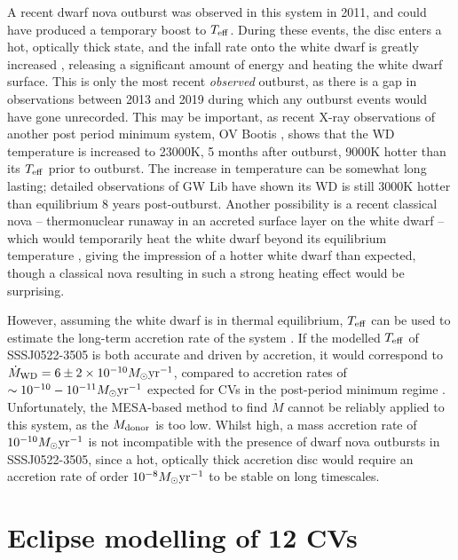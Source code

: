 A recent dwarf nova outburst was observed in this system in 2011, and could have produced a temporary boost to $T_{\rm eff}$. During these events, the disc enters a hot, optically thick state, and the infall rate onto the white dwarf is greatly increased \citep{osaki1996}, releasing a significant amount of energy and heating the white dwarf surface.
This is only the most recent \textit{observed} outburst, as there is a gap in observations between 2013 and 2019 during which any outburst events would have gone unrecorded. This may be important, as recent X-ray observations of another post period minimum system, OV Bootis \citep{Schwope2021}, shows that the WD temperature is increased to 23000K, 5 months after outburst, 9000K hotter than its $T_{\rm eff}$ prior to outburst. The increase in temperature can be somewhat long lasting; detailed observations of GW Lib have shown its WD is still 3000K hotter than equilibrium 8 years post-outburst\citep{Szkody2016}.
Another possibility is a recent classical nova -- thermonuclear runaway in an accreted surface layer on the white dwarf -- which would temporarily heat the white dwarf beyond its equilibrium temperature \citep{starrfield2016}, giving the impression of a hotter white dwarf than expected, though a classical nova resulting in such a strong heating effect would be surprising.

However, assuming the white dwarf is in thermal equilibrium, $T_{\rm eff}$ can be used to estimate the long-term accretion rate of the system \citep{townsley2009}.
If the modelled $T_{\rm eff}$ of SSSJ0522-3505 is both accurate and driven by accretion, it would correspond to $\dot M_{\rm WD} = 6\pm2 \times 10^{-10} M_\odot {\rm yr^{-1}}$, compared to accretion rates of $\sim10^{-10}-10^{-11} M_\odot {\rm yr^{-1}}$ expected for CVs in the post-period minimum regime \citep{Pala2017a}. Unfortunately, the MESA-based method to find $\dot M$ cannot be reliably applied to this system, as the $M_{\rm donor}$ is too low.
Whilst high, a mass accretion rate of $10^{-10} M_\odot {\rm yr^{-1}}$ is not incompatible with the presence of dwarf nova outbursts in SSSJ0522-3505, since a hot, optically thick accretion disc would require an accretion rate of order $10^{-8} M_\odot {\rm yr^{-1}}$ \citep{Hameury1998} to be stable on long timescales.


\section{Eclipse modelling of 12 CVs}
\label{sect:discussion:eclipse modelling of 12 CVs}

